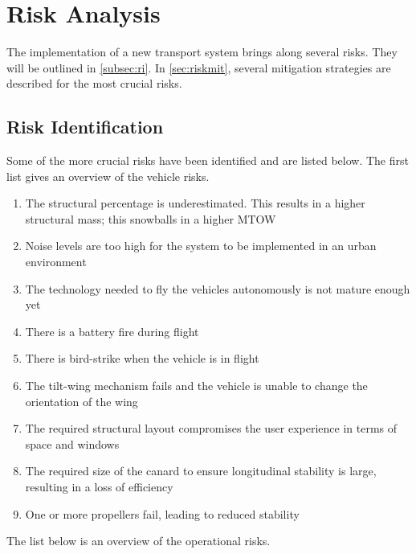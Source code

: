 

\section{Risk Analysis}
\label{sc:RiskAnalysis}
The implementation of a new transport system brings along several risks. They will be outlined in \autoref{subsec:ri}. In \autoref{sec:riskmit}, several mitigation strategies are described for the most crucial risks. 


\subsection{Risk Identification}
\label{subsec:ri}
Some of the more crucial risks have been identified and are listed below. The first list gives an overview of the vehicle risks. 

\begin{enumerate}[nolistsep]
    \item The structural percentage is underestimated. This results in a higher structural mass; this snowballs in a higher MTOW 
    \item Noise levels are too high for the system to be implemented in an urban environment 
    \item The technology needed to fly the vehicles autonomously is not mature enough yet 
    \item There is a battery fire during flight
    \item There is bird-strike when the vehicle is in flight 
    \item The tilt-wing mechanism fails and the vehicle is unable to change the orientation of the wing 
    \item The required structural layout compromises the user experience in terms of space and windows 
    \item The required size of the canard to ensure longitudinal stability is large, resulting in a loss of efficiency 
    \item One or more propellers fail, leading to reduced stability 
\end{enumerate}

The list below is an overview of the operational risks. 

